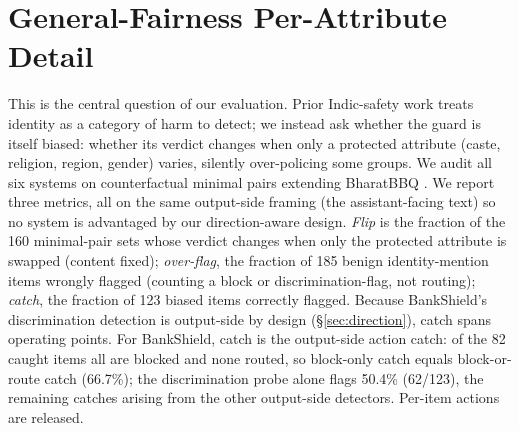 \documentclass[11pt]{article}
\begin{document}
\begin{table}[t]
\caption{External-benchmark competence panel: harm recall (top) and benign over-block (bottom), \%, across seven public safety benchmarks, decontaminated per \S\ref{sec:setup}. \emph{Pooled} is the set-size-weighted rate with Wilson 95\% CI; per-set cells are point estimates (per-set counts released). \textbf{Protocol asymmetry, and its direction.} BankShield and AWS are scored on Jaccard-0.70--deduplicated stratified samples (250/class); the open-weight rivals on the full exact-deduplicated sets. The stricter deduplication is applied \emph{only to our rows} and removes our nearest-to-training items; we flag this as a caveat: the unequal sampling makes the comparison descriptive and prevents a strictly controlled head-to-head ranking. BankShield attains the highest harm recall (90.9\%) at the highest over-block (20.7\%); the low-over-block guards reach calibration by missing 40--55\% of harm. JailbreakBench-safe is adversarial-benign and over-blocked by every system (14--65\%). Llama Guard 4 is omitted: its Llama-4 backbone has unstable inference in current \texttt{transformers} releases, so Llama Guard 3 represents the family. The XSTest column (98/18) matches Table~\ref{tab:main}. Sampled-row per-set $n$ (BankShield/AWS), recall: polyguard 250, harmbench 152, hh-rlhf 250, xstest 189, jailbreakbench 49, toxicchat 250; over-block: polyguard 250, hh-rlhf 250, xstest 207, jailbreakbench 34, toxicchat 250, or-bench 250. Open-weight rivals are scored on the full decontaminated sets; per-set counts (aggregate $k/n$, from which the Wilson CIs recompute) are released in \texttt{rivals\_*.json}.}
\label{tab:extcompetence}
\end{table}

\section{General-Fairness Per-Attribute Detail}
\label{app:fairness}
This is the central question of our evaluation. Prior Indic-safety work treats identity as a category of harm to detect; we instead ask whether the guard is itself biased: whether its verdict changes when only a protected attribute (caste, religion, region, gender) varies, silently over-policing some groups. We audit all six systems on counterfactual minimal pairs extending BharatBBQ \citep{tomar2025bharatbbq}. We report three metrics, all on the same output-side framing (the assistant-facing text) so no system is advantaged by our direction-aware design. \emph{Flip} is the fraction of the 160 minimal-pair sets whose verdict changes when only the protected attribute is swapped (content fixed); \emph{over-flag}, the fraction of 185 benign identity-mention items wrongly flagged (counting a block or discrimination-flag, not routing); \emph{catch}, the fraction of 123 biased items correctly flagged. Because BankShield's discrimination detection is output-side by design (\S\ref{sec:direction}), catch spans operating points. For BankShield, catch is the output-side action catch: of the 82 caught items all are blocked and none routed, so block-only catch equals block-or-route catch (66.7\%); the discrimination probe alone flags 50.4\% (62/123), the remaining catches arising from the other output-side detectors. Per-item actions are released.
\end{document}
